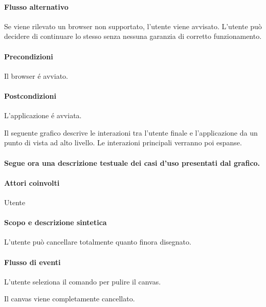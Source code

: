 \paragraph{Flusso alternativo}
Se viene rilevato un browser non supportato, l'utente viene avvisato. L'utente pu\`o decidere di continuare lo stesso senza nessuna garanzia di corretto funzionamento.
\paragraph{Precondizioni} Il browser \'e avviato.
\paragraph{Postcondizioni} L'applicazione \'e avviata.

Il seguente grafico descrive le interazioni tra l'utente finale e l'applicazione da un punto di vista ad alto livello. Le interazioni principali verranno poi espanse.

\paragraph{Segue ora una descrizione testuale dei casi d'uso presentati dal grafico.}

\paragraph{Attori coinvolti} Utente
\paragraph{Scopo e descrizione sintetica}
L'utente pu\`o cancellare totalmente quanto finora disegnato.
\paragraph{Flusso di eventi}
\begin{elenconumerato}[\textbf{}]{\subsubsecindent}
\item L'utente seleziona il comando per pulire il canvas. 
\item Il canvas viene completamente cancellato.
\end{elenconumerato}

